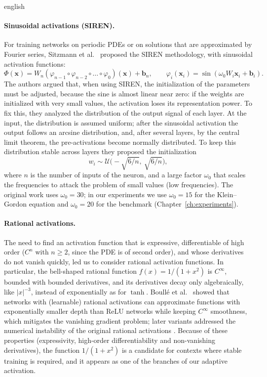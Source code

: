 \documentclass[12pt,letterpaper,twoside]{book}
\newcommand{\abs}[1]{\left\lvert #1 \right\rvert}
\begin{document}
\begin{hyphenrules}{english}
\paragraph{Sinusoidal activations (SIREN).}
For training networks on periodic PDEs or on solutions that are approximated by Fourier series,
Sitzmann et al.~\cite{sitzmann2020} proposed the SIREN methodology, with sinusoidal activation functions:
\begin{equation}
  \Phi(\mathbf{x})=W_n(\varphi_{n-1}\circ\varphi_{n-2}\circ\dots\circ\varphi_0)(\mathbf{x})+\mathbf{b}_n,\qquad
  \varphi_i(\mathbf{x}_i)=\sin(\omega_0W_i\mathbf{x}_i+\mathbf{b}_i).
  \label{eq:siren}
\end{equation}
The authors argued that, when using SIREN, the initialization of the parameters must be adjusted, because
the sine is almost linear near zero: if the weights are initialized with very small values, the activation
loses its representation power. To fix this, they analyzed the distribution of the output signal of each
layer. At the input, the distribution is assumed uniform; after the sinusoidal activation the output
follows an arcsine distribution, and, after several layers, by the central limit theorem, the
pre-activations become normally distributed. To keep this distribution stable across layers they proposed
the initialization
\begin{equation}
  w_i\sim\mathcal{U}\Big(-\sqrt{6/n},\ \sqrt{6/n}\Big),
  \label{eq:siren-init}
\end{equation}
where $n$ is the number of inputs of the neuron, and a large factor $\omega_0$ that scales the frequencies
to attack the problem of small values (low frequencies). The original work uses $\omega_0=30$; in our
experiments we use $\omega_0=15$ for the Klein--Gordon equation and $\omega_0=20$ for the benchmark
(Chapter~\ref{ch:experiments}).

\paragraph{Rational activations.}
The need to find an activation function that is expressive, differentiable of high order ($C^n$ with
$n\ge2$, since the PDE is of second order), and whose derivatives do not vanish quickly, led us to
consider rational activation functions. In particular, the bell-shaped rational function
$f(x)=1/(1+x^2)$ is $C^\infty$, bounded with bounded derivatives, and its derivatives decay only
algebraically, like $\abs{x}^{-3}$, instead of exponentially as for $\tanh$. Boull{\'e} et al.~\cite{boulle2020} showed
that networks with (learnable) rational activations can approximate functions with exponentially smaller
depth than ReLU networks while keeping $C^\infty$ smoothness, which mitigates the vanishing gradient
problem; later variants addressed the numerical instability of the original rational activations
\cite{dubey2022}. Because of these properties (expressivity, high-order differentiability and
non-vanishing derivatives), the function $1/(1+x^2)$ is a candidate for contexts where stable training is
required, and it appears as one of the branches of our adaptive activation.


\end{hyphenrules}
\end{document}
